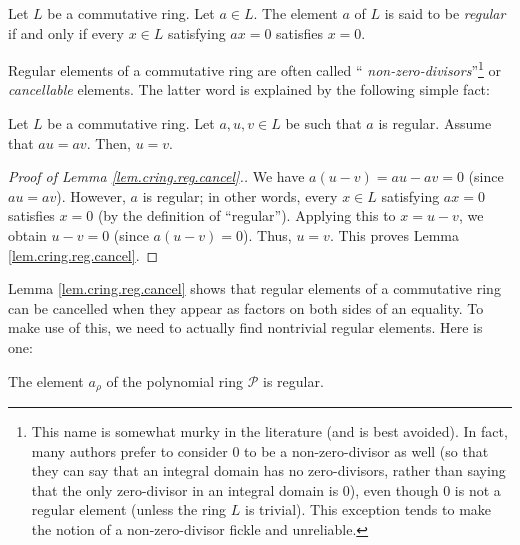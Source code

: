 \begin{definition}
\label{def.cring.reg}Let $L$ be a commutative ring. Let $a\in L$. The element
$a$ of $L$ is said to be \emph{regular} if and only if every $x\in L$
satisfying $ax=0$ satisfies $x=0$.
\end{definition}

Regular elements of a commutative ring are often called \textquotedblleft%
\emph{non-zero-divisors}\textquotedblright\footnote{This name is somewhat
murky in the literature (and is best avoided). In fact, many authors prefer to
consider $0$ to be a non-zero-divisor as well (so that they can say that an
integral domain has no zero-divisors, rather than saying that the only
zero-divisor in an integral domain is $0$), even though $0$ is not a regular
element (unless the ring $L$ is trivial). This exception tends to make the
notion of a non-zero-divisor fickle and unreliable.} or \emph{cancellable}
elements. The latter word is explained by the following simple fact:

\begin{lemma}
\label{lem.cring.reg.cancel}Let $L$ be a commutative ring. Let $a,u,v\in L$ be
such that $a$ is regular. Assume that $au=av$. Then, $u=v$.
\end{lemma}

\begin{proof}
[Proof of Lemma \ref{lem.cring.reg.cancel}.]We have $a\left(  u-v\right)
=au-av=0$ (since $au=av$). However, $a$ is regular; in other words, every
$x\in L$ satisfying $ax=0$ satisfies $x=0$ (by the definition of
\textquotedblleft regular\textquotedblright). Applying this to $x=u-v$, we
obtain $u-v=0$ (since $a\left(  u-v\right)  =0$). Thus, $u=v$. This proves
Lemma \ref{lem.cring.reg.cancel}.
\end{proof}

Lemma \ref{lem.cring.reg.cancel} shows that regular elements of a commutative
ring can be cancelled when they appear as factors on both sides of an
equality. To make use of this, we need to actually find nontrivial regular
elements. Here is one:

\begin{lemma}
\label{lem.sf.arho-reg}The element $a_{\rho}$ of the polynomial ring
$\mathcal{P}$ is regular.
\end{lemma}

